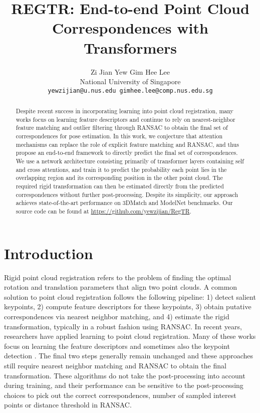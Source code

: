 \documentclass[10pt,twocolumn,letterpaper]{article}
\begin{document}
\title{REGTR: End-to-end Point Cloud Correspondences with Transformers}

\author{Zi Jian Yew \qquad Gim Hee Lee\\
National University of Singapore\\
{\tt\small yewzijian@u.nus.edu \qquad gimhee.lee@comp.nus.edu.sg}
}
\maketitle

\begin{abstract}
Despite recent success in incorporating learning into point cloud registration, many works focus on learning feature descriptors and continue to rely on nearest-neighbor feature matching and outlier filtering through RANSAC to obtain the final set of correspondences for pose estimation.
In this work, we conjecture that attention mechanisms can replace the role of explicit feature matching and RANSAC, and thus propose an end-to-end framework to directly predict the final set of correspondences. We use a network architecture consisting primarily of transformer layers containing self and cross attentions, and train it to predict the probability each point lies in the overlapping region and its corresponding position in the other point cloud.
The required rigid transformation can then be estimated directly from the predicted correspondences without further post-processing.
Despite its simplicity, our approach achieves state-of-the-art performance on 3DMatch and ModelNet benchmarks. Our source code can be found at \url{https://github.com/yewzijian/RegTR}.
\end{abstract}

\section{Introduction}
Rigid point cloud registration refers to the problem of finding the optimal rotation and translation parameters that align two point clouds. A common solution to point cloud registration follows the following pipeline: 1) detect salient keypoints, 2) compute feature descriptors for these keypoints, 3) obtain putative correspondences via nearest neighbor matching, and 4) estimate the rigid transformation, typically in a robust fashion using RANSAC. In recent years, researchers have applied learning to point cloud registration. Many of these works focus on learning the feature descriptors \cite{zeng20163dmatch,deng2018ppfnet,choy2019fcgf} and sometimes also the keypoint detection \cite{yew20183dfeatnet,bai2020d3feat,huang2021predator}. The final two steps generally remain unchanged and these approaches still require nearest neighbor matching and RANSAC to obtain the final transformation. These algorithms do not take the post-processing into account during training, and their performance can be sensitive to the post-processing choices to pick out the correct correspondences, \eg number of sampled interest points or distance threshold in RANSAC. 
\end{document}
